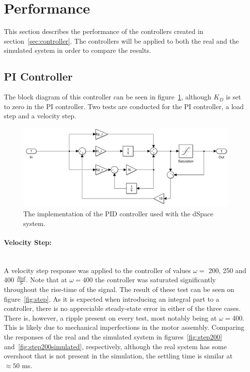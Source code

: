 \section{Performance}
This section describes the performance of the controllers created in section~\ref{sec:controller}.
The controllers will be applied to both the real and the simulated system in order to compare the results.

\subsection{PI Controller}
The block diagram of this controller can be seen in figure~\ref{fig:pidcontroller}, although $K_D$ is set to zero in the PI controller.
Two tests are conducted for the PI controller, a load step and a velocity step.

\begin{figure}[!h]
	\centering
	\includegraphics[width=.75\linewidth]{graphics/pid_controller}
	\caption{The implementation of the PID controller used with the dSpace system.}
	\label{fig:pidcontroller}
\end{figure}

\paragraph{Velocity Step:}~\\
A velocity step response was applied to the controller of values $\omega =$ 200, 250 and 400 $\frac{Rad}{S}$.
Note that at $\omega=400$ the controller was saturated significantly throughout the rise-time of the signal.
The result of these test can be seen on figure~\ref{fig:step}.
As it is expected when introducing an integral part to a controller, there is no appreciable steady-state error in either of the three cases.
There is, however, a ripple present on every test, most notably being at $\omega = 400$.
This is likely due to mechanical imperfections in the motor assembly.
Comparing the responses of the real and the simulated system in figures~\ref{fig:step200} and~\ref{fig:step200simulated}, respectively, although the real system has some overshoot that is not present in the simulation, the settling time is similar at $\approx50$ ms.

